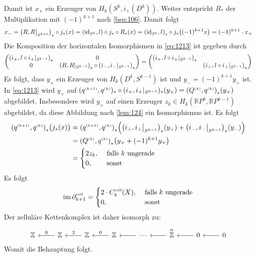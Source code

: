 \begin{beweis}
	Damit ist $x_+$ ein Erzeuger von $H_k(S^k,i_+(D^k))$. 
	Weiter entspricht $R_*$ der Multiplikation mit $(-1)^{k+1}$ nach \autoref{bsp:106}. Damit folgt
	\begin{align*}
		 x_- = \enbrace*{R,R\big|_{S^{k+1}}}_* \circ j_* (x) = \enbrace*{\id_{S^k},l} \circ j_* \circ R_*(x) = \enbrace*{\id_{S^k},l}_* \circ j_* \enbrace*{(-1)^{k+1}x} = 
		 (-1)^{k+1}\cdot x_+    
	\end{align*}
	Die Komposition der horizontalen Isomorphismen in \eqref{eq:1213} ist gegeben durch
	\[
		\begin{pmatrix}
			\enbrace*{i_+,l \circ i_+|_{S^{k-1}}}_* & 0 \\
			0 & \enbrace*{R,R|_{S^{k-1}}}_*  \circ \enbrace*{i_-, i_-|_{S^{k-1}}}_*
		\end{pmatrix}=
		\begin{pmatrix}
			\enbrace*{i_+, l \circ i_+|_{S^{k-1}}}_* & \\
			& \enbrace*{i_+,l \circ i_+|_{S^{k-1}}}_*
		\end{pmatrix}
	\]
	Es folgt, dass $y_+$ ein Erzeuger von $H_k(D^k,S^{k-1})$ ist und $y_- = (-1)^{k+1} y_+$
	ist. 
	In \eqref{eq:1213} wird $y_+$ auf $(q^\ssbrace{k+1},q^\ssbrace{k})_* \circ (i_+,i_+|_{S^{k-1}})_*(y_+) = \enbrace*{Q^\ssbrace{k},q^\ssbrace{k}}_*(y_+)$ abgebildet. 
	Insbesondere wird $y_+$ auf einen Erzeuger $z_k \in H_k(\mathbb{R}P^k,\mathbb{R}P^{k-1})$ abgebildet, da diese Abbildung nach \ref{lem:124} ein Isomorphismus ist. Es folgt 
	\begin{align*}
		\enbrace*{q^\ssbrace{k+1},q^\ssbrace{k}}_* \enbrace[\big]{j_*(x)} &= \enbrace*{q^\ssbrace{k+1},q^\ssbrace{k}}_* \enbrace*{\enbrace*{i_+,i_+\big|_{S^{k-1}}}_*(y_+) +
		\enbrace*{i_-,i_-\big|_{S^{k-1}}}_*(y_-) } \\
		&= \enbrace*{Q^\ssbrace{k},q^\ssbrace{k}}_* \enbrace*{y_+ + (-1)^{k+1} y_+} \\
		& = \begin{cases}
			2 z_k, &\text{ falls }k \text{ ungerade}\\
			0 , &\text{ sonst}
		\end{cases}  
	\end{align*}
	Es folgt 
	\[
		\im  \partial_{k+1}^\cell = \begin{cases}
		2 \cdot C^\cell_k(X), &\text{ falls } k \text{ ungerade}\\
		0 , &\text{ sonst}
	\end{cases}
	\]
	Der zelluläre Kettenkomplex ist daher isomorph zu:
	\[
		\begin{tikzcd}
			\mathbb{Z} & \mathbb{Z} \lar["0"'] & \mathbb{Z} \lar["2"'] & \mathbb{Z} \lar["0"'] & \cdots \lar & \overset{n}{\mathbb{Z}} \lar & 0 \lar & 0 \lar
		\end{tikzcd}
	\]
	Womit die Behauptung folgt.
\end{beweis}

